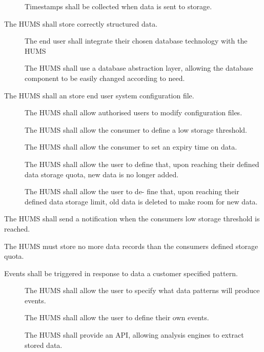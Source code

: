 \begin{description}
\begin{description}
 		 \item[] Timestamps shall be collected when data is sent 			to storage.
	\end{description}
	 \item[\fr{3}] The HUMS shall store correctly structured data.
	 \begin{description}
	 	\item[] The end user shall integrate their chosen database 			technology with the HUMS
	 	\item[] The HUMS shall use a database abstraction layer, 			allowing the database component to be easily changed according to 			need.
	  \end{description}
	 \item[\fr{4}] The HUMS shall an store end user system configuration 			file.
	 \begin{description}
	  	\item[] The HUMS shall allow authorised users to modify
 		configuration files. 
		 \item[] The HUMS shall allow the consumer to define a 				low storage threshold.
		  \item[] The HUMS shall allow the consumer to set an expiry 			time on data.
		  \item[]  The HUMS shall allow the user to define that, 				upon reaching their defined data storage quota, new data is no 				longer added.
		 \item[] The HUMS shall allow the user to de- fine that, upon 			reaching their defined data storage limit, old data is deleted to 			make room for new data.
	\end{description}
	 \item[\fr{5}] The HUMS shall send a notification when the consumers 		low storage threshold is reached.
	  \item[\fr{6}] The HUMS must store no more data records than the 			consumers defined storage quota.
	\item[\fr{7}]Events shall be triggered in response to data a customer 			specified pattern.
		  \begin{description}
			 \item[]  The HUMS shall allow the user to specify 				what data patterns will produce events.
			 \item[] The HUMS shall allow the user to define their
 			own events.
		
 			\item[] The HUMS shall provide an API, 						allowing analysis engines to extract stored data.
		

\end{description}
\end{description}
